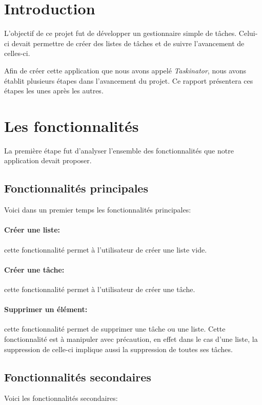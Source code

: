 \documentclass[a4paper,10pt]{article}
\begin{document}
\section{Introduction}
L'objectif de ce projet fut de développer un gestionnaire simple de tâches. Celui-ci devait permettre de créer des listes de tâches et de suivre l'avancement de celles-ci.

Afin de créer cette application que nous avons appelé \textit{Taskinator}, nous avons établit plusieurs étapes dans l'avancement du projet. Ce rapport présentera ces étapes les unes après les autres.

\newpage
\section{Les fonctionnalités}
La première étape fut d'analyser l'ensemble des fonctionnalités que notre application devait proposer. 

\subsection{Fonctionnalités principales}
Voici dans un premier temps les fonctionnalités principales:
\paragraph{Créer une liste:} cette fonctionnalité permet à l'utilisateur de créer une liste vide.
\paragraph{Créer une tâche:} cette fonctionnalité permet à l'utilisateur de créer une tâche.
\paragraph{Supprimer un élément:} cette fonctionnalité permet de supprimer une tâche ou une liste. Cette fonctionnalité est à manipuler avec
précaution, en effet dans le cas d'une liste, la suppression de celle-ci implique aussi la suppression de toutes ses tâches.

\subsection{Fonctionnalités secondaires}
Voici les fonctionnalités secondaires:
\end{document}
